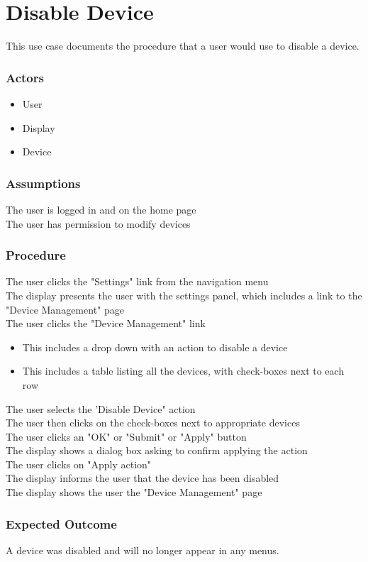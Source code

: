 \section{Disable Device}

This use case documents the procedure that a user would use to disable a device.

\subsubsection{Actors}
\begin{itemize}
	\item User
	\item Display
	\item Device
\end{itemize}

\subsubsection{Assumptions}

The user is logged in and on the home page\\
The user has permission to modify devices

\subsubsection{Procedure}

The user clicks the "Settings" link from the navigation menu\\
The display presents the user with the settings panel, which includes a link to the "Device Management" page\\
The user clicks the "Device Management" link
\begin{itemize}
	\item This includes a drop down with an action to disable a device
	\item This includes a table listing all the devices, with check-boxes next to each row
\end{itemize}
The user selects the 'Disable Device" action\\
The user then clicks on the check-boxes next to appropriate devices\\
The user clicks an "OK" or "Submit" or "Apply" button\\
The display shows a dialog box asking to confirm applying the action\\
The user clicks on "Apply action" \\
The display informs the user that the device has been disabled\\
The display shows the user the "Device Management" page\\

\subsubsection{Expected Outcome}

A device was disabled and will no longer appear in any menus.